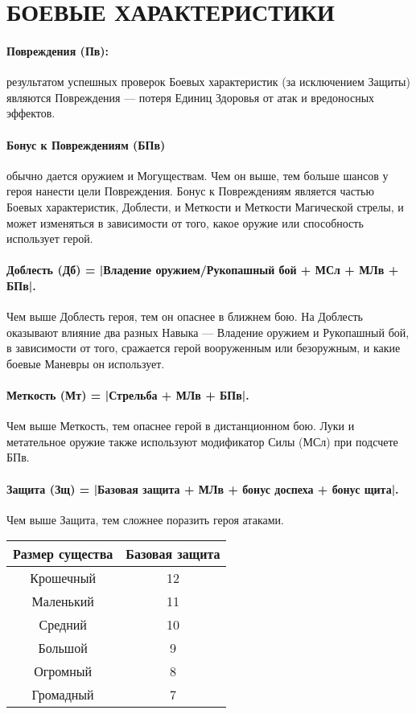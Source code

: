 \section{БОЕВЫЕ ХАРАКТЕРИСТИКИ}
\paragraph{Повреждения (Пв):} результатом успешных проверок Боевых характеристик (за исключением Защиты) являются Повреждения — потеря Единиц Здоровья от атак и вредоносных эффектов.
\paragraph{Бонус к Повреждениям (БПв)} обычно дается оружием и Могуществам. Чем он выше, тем больше шансов у героя нанести цели Повреждения. Бонус к Повреждениям является частью Боевых характеристик, Доблести, и Меткости и Меткости Магической стрелы, и может изменяться в зависимости от того, какое оружие или способность использует герой.
\paragraph{Доблесть (Дб) = |Владение оружием/Рукопашный бой + МСл + МЛв + БПв|.} Чем выше Доблесть героя, тем он опаснее в ближнем бою. На Доблесть оказывают влияние два разных Навыка — Владение оружием и Рукопашный бой, в зависимости от того, сражается герой вооруженным или безоружным, и какие боевые Маневры он использует.
\paragraph{Меткость (Мт) = |Стрельба + МЛв + БПв|.} Чем выше Меткость, тем опаснее герой в дистанционном бою. Луки и метательное оружие также используют модификатор Силы (МСл) при подсчете БПв.
\paragraph{Защита (Зщ) = |Базовая защита + МЛв + бонус доспеха + бонус щита|.} Чем выше Защита, тем сложнее поразить героя атаками.
\begin{center}
\begin{tabular}{ |c|c| }
\hline
\textbf{Размер существа} & \textbf{Базовая защита}
\\ \hline
Крошечный & 12
\\ \hline
Маленький & 11
\\ \hline
Средний & 10
\\ \hline
Большой & 9
\\ \hline
Огромный & 8
\\ \hline
Громадный & 7
\\ \hline
\end{tabular}
\end{center}
